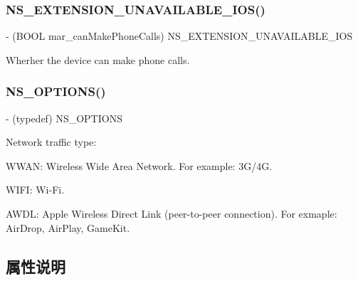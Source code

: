 \subsubsection{\texorpdfstring{N\+S\+\_\+\+E\+X\+T\+E\+N\+S\+I\+O\+N\+\_\+\+U\+N\+A\+V\+A\+I\+L\+A\+B\+L\+E\+\_\+\+I\+O\+S()}{NS\_EXTENSION\_UNAVAILABLE\_IOS()}}
{\footnotesize\ttfamily -\/ (B\+O\+OL mar\+\_\+can\+Make\+Phone\+Calls) N\+S\+\_\+\+E\+X\+T\+E\+N\+S\+I\+O\+N\+\_\+\+U\+N\+A\+V\+A\+I\+L\+A\+B\+L\+E\+\_\+\+I\+OS \begin{DoxyParamCaption}\item[{(\char`\"{}\char`\"{})}]{ }\end{DoxyParamCaption}}



Wherher the device can make phone calls. 

\mbox{\label{category_u_i_device_07_m_a_r_e_x_08_aba32e9a68cbc8bdd5fa716b29b9de0eb}} 
\subsubsection{\texorpdfstring{N\+S\+\_\+\+O\+P\+T\+I\+O\+N\+S()}{NS\_OPTIONS()}}
{\footnotesize\ttfamily -\/ (typedef) N\+S\+\_\+\+O\+P\+T\+I\+O\+NS \begin{DoxyParamCaption}\item[{(N\+S\+U\+Integer)}]{ }\item[{(M\+A\+R\+Network\+Traffic\+Type)}]{ }\end{DoxyParamCaption}}

Network traffic type\+:

W\+W\+AN\+: Wireless Wide Area Network. For example\+: 3\+G/4G.

W\+I\+FI\+: Wi-\/\+Fi.

A\+W\+DL\+: Apple Wireless Direct Link (peer-\/to-\/peer connection). For exmaple\+: Air\+Drop, Air\+Play, Game\+Kit. 

\subsection{属性说明}
\mbox{\label{category_u_i_device_07_m_a_r_e_x_08_aeb0162bf9de5e337734a75fd16d3ecb8}} 
